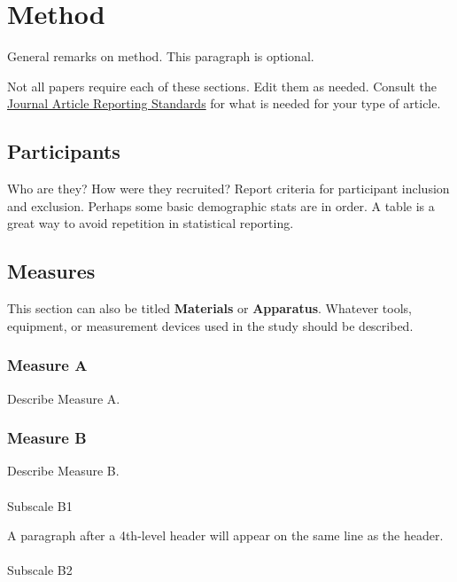 \documentclass[
  letterpaper,
  DIV=11,
  numbers=noendperiod,
  oneside]{scrartcl}
\makeatletter
\let\oldparagraph\paragraph
\renewcommand{\paragraph}{
    \@ifstar
      \xxxParagraphStar
      \xxxParagraphNoStar
  }
\newcommand{\xxxParagraphStar}[1]{\oldparagraph*{#1}\mbox{}}
\newcommand{\xxxParagraphNoStar}[1]{\oldparagraph{#1}\mbox{}}
\makeatother
\begin{document}
\section{Method}\label{method}

General remarks on method. This paragraph is optional.

Not all papers require each of these sections. Edit them as needed.
Consult the \href{https://apastyle.apa.org/jars}{Journal Article
Reporting Standards} for what is needed for your type of article.

\subsection{Participants}\label{participants}

Who are they? How were they recruited? Report criteria for participant
inclusion and exclusion. Perhaps some basic demographic stats are in
order. A table is a great way to avoid repetition in statistical
reporting.

\subsection{Measures}\label{measures}

This section can also be titled \textbf{Materials} or
\textbf{Apparatus}. Whatever tools, equipment, or measurement devices
used in the study should be described.

\subsubsection{Measure A}\label{measure-a}

Describe Measure A.

\subsubsection{Measure B}\label{measure-b}

Describe Measure B.

\paragraph{Subscale B1}\label{subscale-b1}

A paragraph after a 4th-level header will appear on the same line as the
header.

\paragraph{Subscale B2}\label{subscale-b2}
\end{document}
